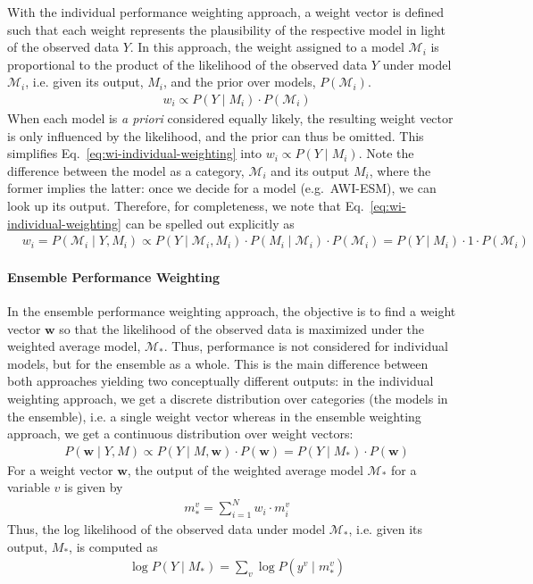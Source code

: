 With the individual performance weighting approach, a weight vector is defined such that each weight represents the plausibility of the respective model in light of the observed data $Y$.
In this approach, the weight assigned to a model $\mathcal{M}_i$ is proportional to the product of the likelihood of the observed data $Y$ under model $\mathcal{M}_i$, i.e. given its output, $M_i$, and the prior over models, $P(\mathcal{M}_i)$.
%
\begin{align}
    &\label{eq:wi-individual-weighting}  w_i \propto P(Y\mid M_i) \cdot P(\mathcal{M}_i)
\end{align}
%
When each model is \emph{a priori} considered equally likely, the resulting weight vector is only influenced by the likelihood, and the prior can thus be omitted. This simplifies Eq.~\eqref{eq:wi-individual-weighting} into $w_i \propto P(Y\mid M_i)$.
Note the difference between the model as a category, $\mathcal{M}_i$ and its output $M_i$, where the former implies the latter: once we decide for a model (e.g.~AWI-ESM), we can look up its output. Therefore, for completeness, we note that Eq.~\eqref{eq:wi-individual-weighting} can be spelled out explicitly as 
%
\begin{align}
    &  w_i = P(\mathcal{M}_i \mid Y, M_i) \propto P(Y\mid \mathcal{M}_i, M_i) \cdot P(M_i\mid \mathcal{M}_i)  \cdot P(\mathcal{M}_i) =  P(Y\mid M_i) \cdot 1 \cdot P(\mathcal{M}_i)
\end{align}


\paragraph*{Ensemble Performance Weighting}
In the ensemble performance weighting approach, the objective is to find a weight vector $\mathbf{w}$ so that the likelihood of the observed data is maximized under the weighted average model, $\mathcal{M}_*$.
Thus, performance is not considered for individual models, but for the ensemble as a whole. This is the main difference between both approaches yielding two conceptually different outputs: in the individual weighting approach, we get a discrete distribution over categories (the models in the ensemble), i.e. a single weight vector whereas in the ensemble weighting approach, we get a continuous distribution over weight vectors:
%
\begin{align}
    & \label{eq:w-ensemble-weighting} P(\mathbf{w}\mid Y, M) \propto P(Y\mid M, \mathbf{w}) \cdot P(\mathbf{w}) = P(Y\mid M_*) \cdot P(\mathbf{w})
\end{align}
%
For a weight vector $\mathbf{w}$, the output of the weighted average model $\mathcal{M}_*$ for a variable $v$ is given by
%
\begin{align}
    & \label{eq:weighted-avg-model}
    m^v_* = \sum_{i=1}^N w_i \cdot m^v_i
\end{align}
Thus, the log likelihood of the observed data under model $\mathcal{M}_*$, i.e. given its output, $M_*$, is computed as
%
\begin{align}
    & \label{eq:logl-m*} \log P(Y\mid M_*) = \sum_v \log P(y^v\mid m_*^v)
\end{align}

